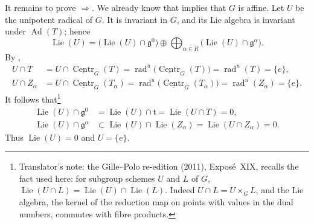 It remains to prove \(\Rightarrow\).  We already know that 
implies that \(G\) is affine.  Let \(U\) be
the unipotent radical of \(G\).  It is invariant in \(G\), and its Lie
algebra is invariant under \(\operatorname{Ad}(T)\); hence
\[
  \operatorname{Lie}(U)
  =
  \bigl(\operatorname{Lie}(U)\cap\mathfrak g^{0}\bigr)
  \oplus
  \bigoplus_{\alpha\in R}
    \bigl(\operatorname{Lie}(U)\cap\mathfrak g^{\alpha}\bigr).
\]
By ,
\[
\begin{aligned}
  U\cap T
    &=
    U\cap\underline{\operatorname{Centr}}_{G}(T)
     =
    \operatorname{rad}^{u}
      \bigl(\underline{\operatorname{Centr}}_{G}(T)\bigr)
     =
    \operatorname{rad}^{u}(T)
     =
    \{e\},\\
  U\cap Z_{\alpha}
    &=
    U\cap\underline{\operatorname{Centr}}_{G}(T_{\alpha})
     =
    \operatorname{rad}^{u}
      \bigl(\underline{\operatorname{Centr}}_{G}(T_{\alpha})\bigr)
     =
    \operatorname{rad}^{u}(Z_{\alpha})
     =
    \{e\}.
\end{aligned}
\]
It follows that\footnote{Translator's note: the Gille--Polo re-edition (2011), Exposé~XIX, recalls the fact used
here: for subgroup schemes \(U\) and \(L\) of \(G\),
\(\operatorname{Lie}(U\cap L)=\operatorname{Lie}(U)\cap\operatorname{Lie}(L)\).
Indeed \(U\cap L=U\times_GL\), and the Lie algebra, the kernel of the reduction
map on points with values in the dual numbers, commutes with fibre products.}
\[
\begin{aligned}
  \operatorname{Lie}(U)\cap\mathfrak g^{0}
    &=
    \operatorname{Lie}(U)\cap\mathfrak t
     =
    \operatorname{Lie}(U\cap T)
     =
    0,\\
  \operatorname{Lie}(U)\cap\mathfrak g^{\alpha}
    &\subset
    \operatorname{Lie}(U)\cap\operatorname{Lie}(Z_{\alpha})
     =
    \operatorname{Lie}(U\cap Z_{\alpha})
     =
    0.
\end{aligned}
\]
Thus \(\operatorname{Lie}(U)=0\) and \(U=\{e\}\).

